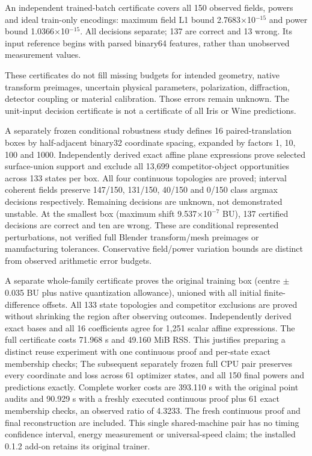 \documentclass[11pt]{article}
\begin{document}
An independent trained-batch certificate covers all 150 observed fields, powers and ideal train-only encodings: maximum field L1 bound 2.7683$\times$10$^{-15}$ and power bound 1.0366$\times$10$^{-15}$. All decisions separate; 137 are correct and 13 wrong. Its input reference begins with parsed binary64 features, rather than unobserved measurement values.

These certificates do not fill missing budgets for intended geometry, native transform preimages, uncertain physical parameters, polarization, diffraction, detector coupling or material calibration. Those errors remain unknown. The unit-input decision certificate is not a certificate of all Iris or Wine predictions.

A separately frozen conditional robustness study defines 16 paired-translation boxes by half-adjacent binary32 coordinate spacing, expanded by factors 1, 10, 100 and 1000. Independently derived exact affine plane expressions prove selected surface-union support and exclude all 13,699 competitor-object opportunities across 133 states per box. All four continuous topologies are proved; interval coherent fields preserve 147/150, 131/150, 40/150 and 0/150 class argmax decisions respectively. Remaining decisions are unknown, not demonstrated unstable. At the smallest box (maximum shift 9.537$\times$10$^{-7}$ BU), 137 certified decisions are correct and ten are wrong. These are conditional represented perturbations, not verified full Blender transform/mesh preimages or manufacturing tolerances. Conservative field/power variation bounds are distinct from observed arithmetic error budgets.

A separate whole-family certificate proves the original training box (centre $\pm$0.035 BU plus native quantization allowance), unioned with all initial finite-difference offsets. All 133 state topologies and competitor exclusions are proved without shrinking the region after observing outcomes. Independently derived exact bases and all 16 coefficients agree for 1,251 scalar affine expressions. The full certificate costs 71.968 s and 49.160 MiB RSS. This justifies preparing a distinct reuse experiment with one continuous proof and per-state exact membership checks; The subsequent separately frozen full CPU pair preserves every coordinate and loss across 61 optimizer states, and all 150 final powers and predictions exactly. Complete worker costs are 393.110 s with the original point audits and 90.929 s with a freshly executed continuous proof plus 61 exact membership checks, an observed ratio of 4.3233. The fresh continuous proof and final reconstruction are included. This single shared-machine pair has no timing confidence interval, energy measurement or universal-speed claim; the installed 0.1.2 add-on retains its original trainer.
\end{document}
